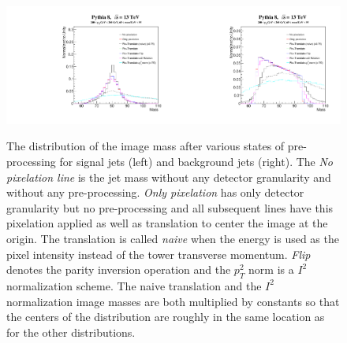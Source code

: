 \begin{figure}[htbp!]
  \begin{center}
        \includegraphics[width=0.5\textwidth]{figures/ImageMass_Comparison.pdf}\includegraphics[width=0.5\textwidth]{figures/ImageMass_Comparison_back.pdf}
      \caption{ The distribution of the image mass after various states of pre-processing for signal jets (left) and background jets (right).  The {\it No pixelation line} is the jet mass without any detector granularity and without any pre-processing.  {\it Only pixelation} has only detector granularity but no pre-processing and all subsequent lines have this pixelation applied as well as translation to center the image at the origin.  The translation is called {\it naive} when the energy is used as the pixel intensity instead of the tower transverse momentum.  {\it Flip} denotes the parity inversion operation and the $p_T^2$ norm is a $I^2$ normalization scheme.  The naive translation and the $I^2$ normalization image masses are both multiplied by constants so that the centers of the distribution are roughly in the same location as for the other distributions.
      \label{fig:preprocess2} }
    \end{center}
\end{figure}


